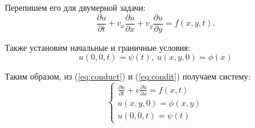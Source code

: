 Перепишем его для двумерной задачи:
\begin{equation}
	\frac{\partial u}{\partial t} + v_{x} \frac{\partial u}{\partial x} + v_{y}\frac{\partial u}{\partial y} = f(x,y,t).
	\label{eq:conduct}
\end{equation}

Также установим начальные и граничные условия:
\begin{equation}
	u(0,0,t) = \psi(t), \ u(x,y,0) = \phi(x)
	\label{eq:condit}
\end{equation}

Таким образом, из (\ref{eq:conduct}) и (\ref{eq:condit}) получаем систему:
\begin{equation}
	\begin{cases}
			\frac{\partial u}{\partial t} + v \frac{\partial u}{\partial x} = f(x,t) \\
			u(x,y,0) = \phi(x,y) \\
			u(0,0,t) = \psi(t)
	\end{cases}
	\label{eq:sys}
\end{equation}